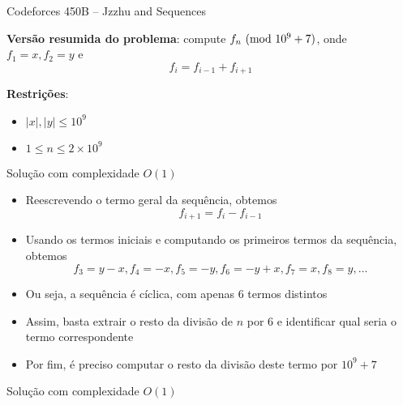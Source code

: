 \begin{frame}[fragile]{Codeforces 450B -- Jzzhu and Sequences}

    \textbf{Versão resumida do problema}: compute $f_n\ (\mbox{mod}\ 10^9 + 7)$, onde $f_1 = x, f_2 = y$
    e
    $$
        f_i = f_{i - 1} + f_{i + 1}
    $$

    \vspace{0.1in}
    \textbf{Restrições}:

    \begin{itemize}
        \item $|x|, |y| \leq 10^9$
        \item $1\leq n\leq 2\times 10^9$
    \end{itemize}
\end{frame}

\begin{frame}[fragile]{Solução com complexidade $O(1)$}

    \begin{itemize}
        \item Reescrevendo o termo geral da sequência, obtemos
        $$
            f_{i + 1} = f_i - f_{i - 1}
        $$

        \item Usando os termos iniciais e computando os primeiros termos da sequência, obtemos
        $$
            f_3 = y - x, f_4 = -x, f_5 = -y, f_6 = -y + x, f_7 = x, f_8 = y, \ldots
        $$

        \item Ou seja, a sequência é cíclica, com apenas 6 termos distintos

        \item Assim, basta extrair o resto da divisão de $n$ por 6 e identificar qual seria o 
            termo correspondente

        \item Por fim, é preciso computar o resto da divisão deste termo por $10^9 + 7$
    \end{itemize}

\end{frame}

\begin{frame}[fragile]{Solução com complexidade $O(1)$}
\end{frame}
